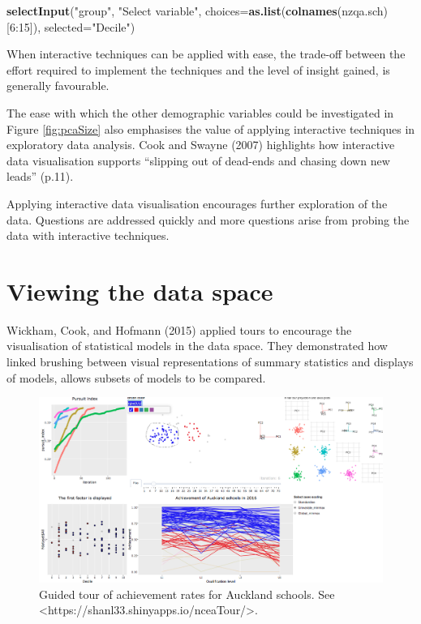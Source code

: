 \documentclass[]{book}
\newenvironment{Shaded}{\begin{snugshade}}{\end{snugshade}}
\newcommand{\KeywordTok}[1]{\textcolor[rgb]{0.13,0.29,0.53}{\textbf{{#1}}}}
\newcommand{\DataTypeTok}[1]{\textcolor[rgb]{0.13,0.29,0.53}{{#1}}}
\newcommand{\DecValTok}[1]{\textcolor[rgb]{0.00,0.00,0.81}{{#1}}}
\newcommand{\StringTok}[1]{\textcolor[rgb]{0.31,0.60,0.02}{{#1}}}
\newcommand{\NormalTok}[1]{{#1}}
\theoremstyle{definition}
\theoremstyle{definition}
\theoremstyle{definition}
\theoremstyle{remark}
\begin{document}
\begin{Shaded}
\begin{Highlighting}[]
\KeywordTok{selectInput}\NormalTok{(}\StringTok{"group"}\NormalTok{, }\StringTok{"Select variable"}\NormalTok{, }\DataTypeTok{choices=}\KeywordTok{as.list}\NormalTok{(}\KeywordTok{colnames}\NormalTok{(nzqa.sch)[}\DecValTok{6}\NormalTok{:}\DecValTok{15}\NormalTok{]), }\DataTypeTok{selected=}\StringTok{"Decile"}\NormalTok{)}
\end{Highlighting}
\end{Shaded}

\begin{boxed}
When interactive techniques can be applied with ease, the trade-off
between the effort required to implement the techniques and the level of
insight gained, is generally favourable.
\end{boxed}

The ease with which the other demographic variables could be
investigated in Figure \ref{fig:pcaSize} also emphasises the value of
applying interactive techniques in exploratory data analysis. Cook and
Swayne (2007) highlights how interactive data visualisation supports
``slipping out of dead-ends and chasing down new leads'' (p.11).

\begin{boxed}
Applying interactive data visualisation encourages further exploration
of the data. Questions are addressed quickly and more questions arise
from probing the data with interactive techniques.
\end{boxed}

\section{Viewing the data space}\label{viewing-the-data-space}

Wickham, Cook, and Hofmann (2015) applied tours to encourage the
visualisation of statistical models in the data space. They demonstrated
how linked brushing between visual representations of summary statistics
and displays of models, allows subsets of models to be compared.

\begin{figure}[center]
\includegraphics[width=500px]{files/finalApp} \caption{Guided tour of achievement rates for Auckland schools. See <https://shanl33.shinyapps.io/nceaTour/>.}\label{fig:nceaTour}
\end{figure}
\end{document}
